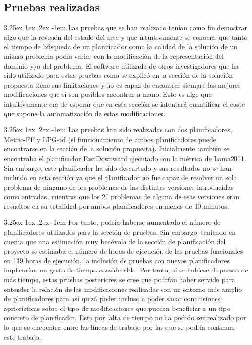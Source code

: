 \documentclass{article}
\makeatletter
\renewcommand\paragraph{\@startsection{paragraph}{5}{\z@}%
  {3.25ex \@plus1ex \@minus.2ex}%
  {-1em}%
  {\normalfont\normalsize\bfseries}}
\makeatother
\begin{document}
\subsection{Pruebas realizadas}
\paragraph{}
Las pruebas que se han realizado tenían como fin demostrar algo que la revisión del estado del arte y que intuitivamente se conocía: que tanto el tiempo de búsqueda de un planificador como la calidad de la solución de un mismo problema podía variar con la modificación de la representación del dominio y/o del problema. El software utilizado de otros investigadores que ha sido utilizado para estas pruebas como se explicó en la sección de la solución propuesta tiene sus limitaciones y no es capaz de encontrar siempre las mejores modificaciones que sí son posibles encontrar a mano. Esto es algo que intuitivamente era de esperar que en esta sección se intentará cuantificar el coste que supone la automatización de estas modificaciones.

\paragraph{}
Las pruebas han sido realizadas con dos planificadores, Metric-FF y LPG-td (el funcionamiento de ambos planificadores puede encontrarse en la sección de la solución propuesta). Inicialmente también se encontraba el planificador FastDownward ejecutado con la métrica de Lama2011. Sin embargo, este planificador ha sido descartado y sus resultados no se han incluido en esta sección ya que el planificador no fue capaz de resolver un solo problema de ninguno de los problemas de las distintas versiones introducidas como entradas, mientras que los 20 problemas de alguna de esas versiones eran resueltos en su totalidad por ambos planificadores en menos de 10 minutos.

\paragraph{}
Por tanto, podría haberse aumentado el número de planificadores utilizados para la sección de pruebas. Sin embargo, teniendo en cuenta que una estimación muy benévola de la sección de planificación del proyecto se estimaba el número de horas de ejecución de las pruebas funcionales en 139 horas de ejecución, la inclusión de pruebas con nuevos planificadores implicarían un gasto de tiempo considerable. Por tanto, si se hubiese dispuesto de más tiempo, estas pruebas posteriores se cree que podrían haber servido para entender la relación de las modificaciones realizadas con un entorno más amplio de planificadores para así quizá poder incluso a poder sacar conclusiones apriorísticas sobre el tipo de modificaciones que pueden beneficiar a un tipo concreto de planificador. Esto por falta de tiempo no ha podido ser realizado por lo que se encuentra entre las líneas de trabajo por las que se podría continuar este trabajo.
\end{document}
